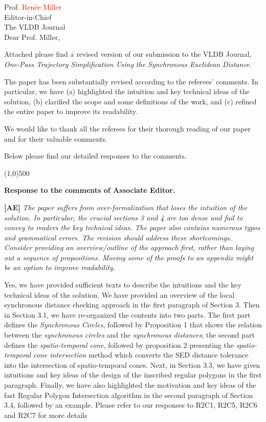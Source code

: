 \documentclass{letter}
\newcommand{\marked}[1]{\textcolor{red}{#1}}
\begin{document}
Prof. \marked{Renée Miller} \\
Editor-in-Chief		\\
The VLDB Journal	\\



Dear Prof. Miller,

Attached please find a revised version of our submission to
the VLDB Journal, \emph{One-Pass Trajectory Simplification Using the Synchronous Euclidean Distance}.


The paper has been substantially revised according to the referees' comments. In particular, we have {(a) highlighted the intuition and key technical ideas of the solution, (b) clarified the scope and some definitions of the work, and (c) refined the entire paper to improve its readability.}

We would like to thank all the referees for their thorough reading of our paper and for their valuable comments.

Below please find our detailed responses to the comments.


\line(1,0){500}

\textbf{Response to the comments of Associate Editor.}

\textbf{[AE]} \emph{The paper suffers from over-formalization that loses the intuition of the solution. In particular, the crucial sections 3 and 4 are too dense and fail to convey to readers the key technical ideas. The paper also contains numerous typos and grammatical errors. The revision should address these shortcomings. Consider providing an overview/outline of the approach first, rather than laying out a sequence of propositions. Moving some of the proofs to an appendix might be an option to improve readability. }

Yes, we have provided sufficient texts to describe the intuitions and the key technical ideas of the solution. We have provided an overview of the local synchronous distance checking approach in the first paragraph of Section 3. Then in Section 3.1, we have re-organized the contents into two parts. The first part defines the \emph{Synchronous Circles}, followed by Proposition 1 that shows the relation between the \textit{synchronous circles} and the \textit{synchronous distances}; the second part defines the \textit{spatio-temporal cone}, followed by proposition 2 presenting the \textit{spatio-temporal cone intersection} method which converts the SED distance tolerance into the intersection of spatio-temporal cones.
Next, in Section 3.3, we have given intuitions and key ideas of the design of the inscribed regular polygons in the first paragraph. 
Finally, we have also highlighted the motivation and key ideas of the fast Regular Polygon Intersection algorithm in the second paragraph of Section 3.4, followed by an example. 
Please refer to our responses to R2C1, R2C5, R2C6 and R2C7 for more details
\end{document}
